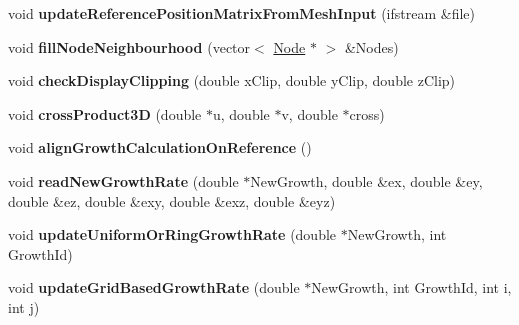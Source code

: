 \begin{DoxyCompactItemize}
\item 
\hypertarget{classShapeBase_a29d28195e334308f1b3afba113ef1212}{}void {\bfseries update\+Reference\+Position\+Matrix\+From\+Mesh\+Input} (ifstream \&file)\label{classShapeBase_a29d28195e334308f1b3afba113ef1212}

\item 
\hypertarget{classShapeBase_afe299910c51313a27526c585df128047}{}void {\bfseries fill\+Node\+Neighbourhood} (vector$<$ \hyperlink{classNode}{Node} $\ast$ $>$ \&Nodes)\label{classShapeBase_afe299910c51313a27526c585df128047}

\item 
\hypertarget{classShapeBase_a3a3490f8a96e14e59b82f4de24ce48e2}{}void {\bfseries check\+Display\+Clipping} (double x\+Clip, double y\+Clip, double z\+Clip)\label{classShapeBase_a3a3490f8a96e14e59b82f4de24ce48e2}

\item 
\hypertarget{classShapeBase_ab5c4c774227af1d446f80c0ef58044c9}{}void {\bfseries cross\+Product3\+D} (double $\ast$u, double $\ast$v, double $\ast$cross)\label{classShapeBase_ab5c4c774227af1d446f80c0ef58044c9}

\item 
\hypertarget{classShapeBase_a9a980e69b3ccad29e21499921d575829}{}void {\bfseries align\+Growth\+Calculation\+On\+Reference} ()\label{classShapeBase_a9a980e69b3ccad29e21499921d575829}

\item 
\hypertarget{classShapeBase_a8f1565bbfd6c6a1452d95d910b4f7d9e}{}void {\bfseries read\+New\+Growth\+Rate} (double $\ast$New\+Growth, double \&ex, double \&ey, double \&ez, double \&exy, double \&exz, double \&eyz)\label{classShapeBase_a8f1565bbfd6c6a1452d95d910b4f7d9e}

\item 
\hypertarget{classShapeBase_a62f7b57ae77a98a009ba2c5cd520fa71}{}void {\bfseries update\+Uniform\+Or\+Ring\+Growth\+Rate} (double $\ast$New\+Growth, int Growth\+Id)\label{classShapeBase_a62f7b57ae77a98a009ba2c5cd520fa71}

\item 
\hypertarget{classShapeBase_aff32f6cd08aba5c167297852b72e40b0}{}void {\bfseries update\+Grid\+Based\+Growth\+Rate} (double $\ast$New\+Growth, int Growth\+Id, int i, int j)\label{classShapeBase_aff32f6cd08aba5c167297852b72e40b0}

\end{DoxyCompactItemize}
